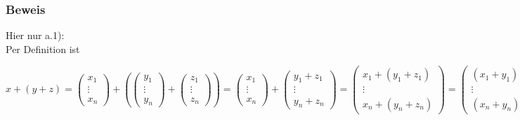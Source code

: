 \documentclass{article}
\begin{document}
\subsubsection*{Beweis}
Hier nur a.1): \\
Per Definition ist \\
\begin{center}
$x + (y + z) = \begin{pmatrix}
    x_1 \\
    \vdots \\
    x_n
\end{pmatrix} + \left( \begin{pmatrix}
    y_1 \\
    \vdots \\
    y_n
\end{pmatrix} + \begin{pmatrix}
    z_1 \\
    \vdots \\
    z_n
\end{pmatrix} \right) = \begin{pmatrix}
    x_1 \\
    \vdots \\
    x_n
\end{pmatrix} + \begin{pmatrix}
    y_1 + z_1 \\
    \vdots \\
    y_n + z_n
\end{pmatrix} = \begin{pmatrix}
    x_1 + (y_1 + z_1) \\
    \vdots \\
    x_n + (y_n + z_n)
\end{pmatrix} = \begin{pmatrix}
    (x_1 + y_1) + z_1 \\
    \vdots \\
    (x_n + y_n) + z_n
\end{pmatrix} = \left( \begin{pmatrix}
    x_1 \\
    \vdots \\
    x_n
\end{pmatrix} + \begin{pmatrix}
    y_1 \\
    \vdots \\
    y_n
\end{pmatrix} \right) + \begin{pmatrix}
    z_1 \\
    \vdots \\
    z_n
\end{pmatrix} = (x + y) + z$
\end{center}
\end{document}

